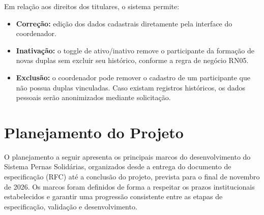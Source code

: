 \documentclass[12pt,a4paper]{article}
\begin{document}
Em relação aos direitos dos titulares, o sistema permite:

\begin{itemize}
    \item \textbf{Correção:} edição dos dados cadastrais diretamente pela interface do coordenador.
    \item \textbf{Inativação:} o toggle de ativo/inativo remove o
    participante da formação de novas duplas sem excluir seu histórico,
    conforme a regra de negócio RN05.
    \item \textbf{Exclusão:} o coordenador pode remover o cadastro de um
    participante que não possua duplas vinculadas. Caso existam registros
    históricos, os dados pessoais serão anonimizados mediante solicitação.
\end{itemize}
\section{Planejamento do Projeto}

O planejamento a seguir apresenta os principais marcos do desenvolvimento do
Sistema Pernas Solidárias, organizados desde a entrega do documento de
especificação (RFC) até a conclusão do projeto, prevista para o final de
novembro de 2026. Os marcos foram definidos de forma a respeitar os prazos
institucionais estabelecidos e garantir uma progressão consistente entre as
etapas de especificação, validação e desenvolvimento.

\vspace{0.4cm}
\end{document}
